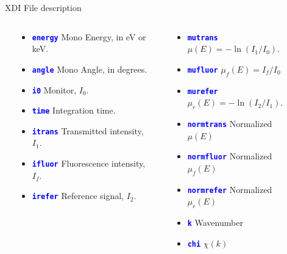 \documentclass[final]{beamer}
\newcommand{\Color}[2]{{\textcolor{#1}{#2}}}
\newcommand{\Blue}[1]{{\Color{Blue}{\bf{#1}}}}
\begin{document}
\begin{frame}{}
\begin{columns}[t]
\begin{column}{.44\linewidth}
\begin{block}{\large XDI File description}
         \begin{columns}[T]
           \begin{column}{0.06\linewidth}
           \end{column}
           \begin{column}{0.41\linewidth}
             \begin{itemize}
             \item {\Blue{\tt{energy}}}  Mono Energy, in eV or keV.
             \item {\Blue{\tt{angle}}}   Mono Angle, in degrees.
             \item {\Blue{\tt{i0}}}      Monitor, $I_0$.
             \item {\Blue{\tt{time}}}    Integration time.
             \item {\Blue{\tt{itrans}}}  Transmitted intensity, $I_1$.
             \item {\Blue{\tt{ifluor}}}  Fluorescence intensity, $I_f$.
             \item {\Blue{\tt{irefer}}}  Reference signal, $I_2$.
             \end{itemize}
           \end{column}
           \begin{column}{0.06\linewidth}
           \end{column}
           \begin{column}{0.41\linewidth}
               \begin{itemize}
               \item {\Blue{\tt{mutrans}}}   $\mu(E) = -\ln(I_1/I_0)$.
               \item {\Blue{\tt{mufluor}}}   $\mu_f(E) = I_f/I_0$
               \item {\Blue{\tt{murefer}}}   $\mu_r(E) = -\ln(I_2/I_1)$.
               \item {\Blue{\tt{normtrans}}} Normalized $\mu(E)$
               \item {\Blue{\tt{normfluor}}} Normalized $\mu_f(E)$
               \item {\Blue{\tt{normrefer}}} Normalized $\mu_r(E)$
               \item {\Blue{\tt{k}}}         Wavenumber
               \item {\Blue{\tt{chi}}}       $\chi(k)$
               \end{itemize}
           \end{column}
           \begin{column}{0.06\linewidth}
           \end{column}
         \end{columns}


\end{block}
\end{column}
\end{columns}
\end{frame}
\end{document}
